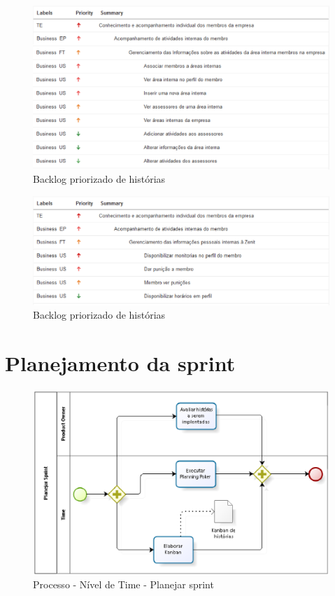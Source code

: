 \begin{figure}[H]
    \centering
    \includegraphics[keepaspectratio=true,scale=0.6]{figuras/blus07.eps}
    \caption[Backlog história]{Backlog priorizado de histórias\label{backlogus07}}
\end{figure}

\begin{figure}[H]
    \centering
    \includegraphics[keepaspectratio=true,scale=0.6]{figuras/blus08.eps}
    \caption[Backlog história]{Backlog priorizado de histórias\label{backlogus08}}
\end{figure}

\section{Planejamento da sprint}

\begin{figure}[H]
    \centering
    \label{identificarPlanejar}
    \includegraphics[keepaspectratio=true,scale=0.6]{figuras/processoPlanejar.eps}
    \caption[Planejar sprint]{Processo - Nível de Time - Planejar sprint}
\end{figure}


